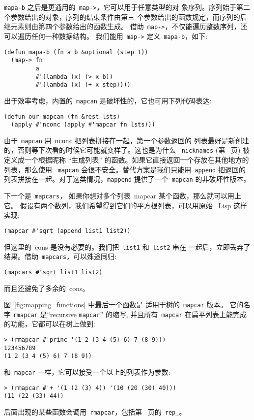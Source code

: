 \texttt{mapa-b} 之后是更通用的~\texttt{map->}，它可以用于任意类型的对
象序列。序列始于第二个参数给出的对象，序列的结束条件由第三
个参数给出的函数规定，而序列的后继元素则由第四个参数给出的函数生成。
借助~\texttt{map->}，不仅能遍历整数序列，还可以遍历任何一种数据结构。
我们能用~\texttt{map->} 定义~\texttt{mapa-b}，如下:
\begin{lstlisting}
(defun mapa-b (fn a b &optional (step 1))
  (map-> fn
         a
         #'(lambda (x) (> x b))
         #'(lambda (x) (+ x step))))
\end{lstlisting}

出于效率考虑，内置的~\texttt{mapcan} 是破坏性的，它也可用下列代码表达:
\begin{lstlisting}
(defun our-mapcan (fn &rest lsts)
  (apply #'nconc (apply #'mapcar fn lsts)))
\end{lstlisting}
由于~\texttt{mapcan} 用~\texttt{nconc} 把列表拼接在一起，第一个参数返回的
列表最好是新创建的，否则等下次看的时候它可能就变样了。这也是为什么
~\texttt{nicknames} (第~\pageref{page:nicknames} 页) 被定义成一个根据昵称
``生成列表'' 的函数。如果它直接返回一个存放在其他地方的列表，那么使用
~\texttt{mapcan} 会很不安全。替代方案是我们只能用~\texttt{append} 把返回的
列表拼接在一起。对于这类情况，\texttt{mappend} 提供了一个~\texttt{mapcan}
的非破坏性版本。

下一个\utility{}是~\texttt{mapcars}，
如果你想对多个列表~mapcar 某个函数，那么就可以用上它。
假设有两个数列，我们希望得到它们的平方根列表，可以用原始
~Lisp 这样实现:
\begin{lstlisting}
(mapcar #'sqrt (append list1 list2))
\end{lstlisting}
但这里的~cons 是没有必要的。我们把~\texttt{list1} 和~\texttt{list2} 串在
一起后，立即丢弃了结果。借助~\texttt{mapcars}，可以殊途同归:
\begin{lstlisting}
(mapcars #'sqrt list1 list2)
\end{lstlisting}
而且还避免了多余的~cons。

图~\ref{fig:mapping_functions} 中最后一个函数是
适用于树的~\texttt{mapcar} 版本。
它的名字 \texttt{rmapcar} 是``recursive \texttt{mapcar}'' 的缩写,
并且所有~\texttt{mapcar} 在扁平列表上能完成的功能，它都可以在树上做到:
\begin{lstlisting}
> (rmapcar #'princ '(1 2 (3 4 (5) 6) 7 (8 9)))
123456789
(1 2 (3 4 (5) 6) 7 (8 9))
\end{lstlisting}
和~\texttt{mapcar} 一样，它可以接受一个以上的列表作为参数:
\begin{lstlisting}
> (rmapcar #'+ '(1 (2 (3) 4)) '(10 (20 (30) 40)))
(11 (22 (33) 44))
\end{lstlisting}
后面出现的某些函数会调用~\texttt{rmapcar}，包括第~\pageref{fig:prolog:toplevel_macro} 页的~\verb|rep_|。

